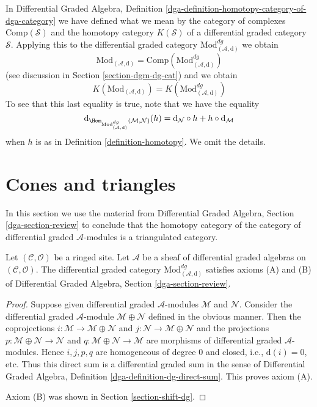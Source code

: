 \medskip\noindent
In Differential Graded Algebra, Definition
\ref{dga-definition-homotopy-category-of-dga-category}
we have defined what we mean by the category of complexes
$\text{Comp}(\mathcal{S})$
and the homotopy category $K(\mathcal{S})$
of a differential graded category $\mathcal{S}$.
Applying this to the differential graded category
$\text{Mod}^{dg}_{(\mathcal{A}, \text{d})}$ we obtain
$$
\text{Mod}_{(\mathcal{A}, \text{d})} =
\text{Comp}(\text{Mod}^{dg}_{(\mathcal{A}, \text{d})})
$$
(see discussion in Section \ref{section-dgm-dg-cat}) and we obtain
$$
K(\text{Mod}_{(\mathcal{A}, \text{d})}) =
K(\text{Mod}^{dg}_{(\mathcal{A}, \text{d})})
$$
To see that this last equality is true, note that we have the equality
$$
\text{d}_{\Hom_{\text{Mod}^{dg}_{(\mathcal{A}, \text{d})}}
(\mathcal{M}, \mathcal{N})}(h) =
\text{d}_\mathcal{N} \circ h + h \circ \text{d}_\mathcal{M}
$$
when $h$ is as in Definition \ref{definition-homotopy}. We omit the
details.











\section{Cones and triangles}
\label{section-conclude-triangulated}

\noindent
In this section we use the material from
Differential Graded Algebra, Section \ref{dga-section-review}
to conclude that the homotopy category of the
category of differential graded $\mathcal{A}$-modules
is a triangulated category.

\begin{lemma}
\label{lemma-axioms-AB}
Let $(\mathcal{C}, \mathcal{O})$ be a ringed site.
Let $\mathcal{A}$ be a sheaf of differential graded algebras
on $(\mathcal{C}, \mathcal{O})$.
The differential graded category
$\text{Mod}^{dg}_{(\mathcal{A}, \text{d})}$
satisfies axioms (A) and (B) of
Differential Graded Algebra, Section \ref{dga-section-review}.
\end{lemma}

\begin{proof}
Suppose given differential graded $\mathcal{A}$-modules
$\mathcal{M}$ and $\mathcal{N}$. Consider the
differential graded $\mathcal{A}$-module $\mathcal{M} \oplus \mathcal{N}$
defined in the obvious manner. Then the coprojections
$i : \mathcal{M} \to \mathcal{M} \oplus \mathcal{N}$ and
$j : \mathcal{N} \to \mathcal{M} \oplus \mathcal{N}$ and the
projections
$p : \mathcal{M} \oplus \mathcal{N} \to \mathcal{N}$ and
$q : \mathcal{M} \oplus \mathcal{N} \to \mathcal{M}$
are morphisms of differential graded $\mathcal{A}$-modules.
Hence $i, j, p, q$ are homogeneous
of degree $0$ and closed, i.e., $\text{d}(i) = 0$, etc.
Thus this direct sum is a differential graded sum in the sense of
Differential Graded Algebra, Definition \ref{dga-definition-dg-direct-sum}.
This proves axiom (A).

\medskip\noindent
Axiom (B) was shown in Section \ref{section-shift-dg}.
\end{proof}

